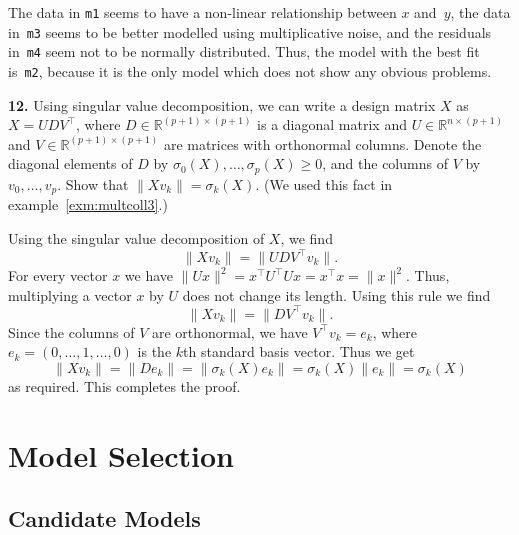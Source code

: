 \documentclass[
  a4paper,
]{article}
\theoremstyle{definition}
\theoremstyle{definition}
\theoremstyle{definition}
\theoremstyle{definition}
\theoremstyle{remark}
\begin{document}
\begin{myanswers}
The data in \texttt{m1} seems to
have a non-linear relationship between \(x\) and~\(y\), the data
in~\texttt{m3} seems to be better modelled using multiplicative noise,
and the residuals in~\texttt{m4} seem not to be normally
distributed. Thus, the model with the best fit is~\texttt{m2},
because it is the only model which does not show any obvious
problems.

\end{myanswers}

\textbf{12.} Using singular value decomposition,
we can write a design matrix \(X\) as \(X = U D V^\top\),
where \(D\in\mathbb{R}^{(p+1)\times(p+1)}\) is a diagonal matrix
and \(U\in\mathbb{R}^{n\times(p+1)}\) and \(V\in\mathbb{R}^{(p+1)\times(p+1)}\) are matrices with orthonormal columns.
Denote the diagonal elements of \(D\) by \(\sigma_0(X), \ldots, \sigma_p(X) \geq 0\),
and the columns of \(V\) by \(v_0, \ldots, v_p\).
Show that \(\| X v_k \| = \sigma_k(X)\).
(We used this fact in example~\ref{exm:multcoll3}.)

\begin{myanswers}
Using the singular value decomposition of \(X\), we find
\begin{equation*}
  \| X v_k \|
  = \| U D V^\top v_k \|.
\end{equation*}
For every vector \(x\) we
have \(\| U x \|^2 = x^\top U^\top U x = x^\top x = \| x \|^2\).
Thus, multiplying a vector \(x\) by \(U\) does
not change its length. Using this rule we find
\begin{equation*}
  \| X v_k \|
  = \| D V^\top v_k \|.
\end{equation*}
Since the columns of \(V\) are orthonormal, we have \(V^\top v_k = e_k\),
where \(e_k = (0, \ldots, 1, \ldots, 0)\) is the \(k\)th standard basis vector.
Thus we get
\begin{equation*}
  \| X v_k \|
  = \| D e_k \|
  = \| \sigma_k(X) e_k \|
  = \sigma_k(X) \| e_k \|
  = \sigma_k(X)
\end{equation*}
as required. This completes the proof.

\end{myanswers}

\clearpage

\section{Model Selection}\label{S12-selection}

\subsection{Candidate Models}\label{candidate-models}
\end{document}

